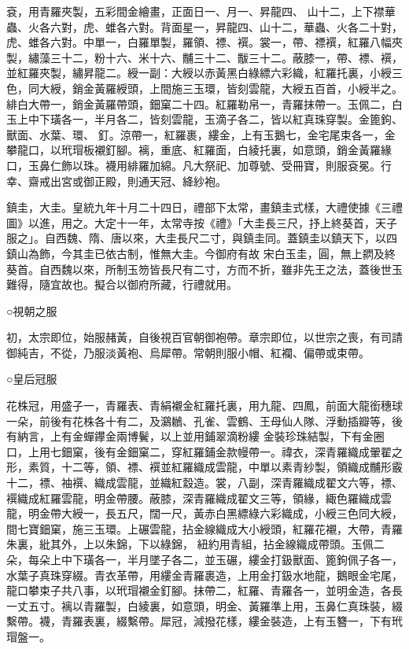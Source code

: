 \begin{pinyinscope}
 袞，用青羅夾製，五彩間金繪畫，正面日一、月一、昇龍四、
 山十二，上下襟華蟲、火各六對，虎、蜼各六對。背面星一，昇龍四、山十二，華蟲、火各二十對，虎、蜼各六對。中單一，白羅單製，羅領、褾、襈。裳一，帶、褾襈，紅羅八幅夾製，繡藻三十二，粉十六、米十六、黼三十二、黻三十二。蔽膝一，帶、褾、襈，並紅羅夾製，繡昇龍二。綬一副：大綬以赤黃黑白綠縹六彩織，紅羅托裏，小綬三色，同大綬，銷金黃羅綬頭，上間施三玉環，皆刻雲龍，大綬五百首，小綬半之。緋白大帶一，銷金黃羅帶頭，鈿窠二十四。紅羅勒帛一，青羅抹帶一。玉佩二，白玉上中下璜各一，半月各二，皆刻雲龍，玉滴子各二，皆以紅真珠穿製。金篦鉤、獸面、水葉、環、
 釘。涼帶一，紅羅裹，縷金，上有玉鵝七，金宅尾束各一，金攀龍口，以玳瑁板襯釘腳。褵，重底、紅羅面，白綾托裏，如意頭，銷金黃羅緣口，玉鼻仁飾以珠。襪用緋羅加綿。凡大祭祀、加尊號、受冊寶，則服袞冕。行幸、齋戒出宮或御正殿，則通天冠、絳紗袍。



 鎮圭，大圭。皇統九年十月二十四日，禮部下太常，畫鎮圭式樣，大禮使據《三禮圖》以進，用之。大定十一年，太常寺按《禮》「大圭長三尺，抒上終葵首，天子服之」。自西魏、隋、唐以來，大圭長尺二寸，與鎮圭同。蓋鎮圭以鎮天下，以四鎮山為飾，今其圭已依古制，惟無大圭。今御府有故
 宋白玉圭，圓，無上閷及終葵首。自西魏以來，所制玉笏皆長尺有二寸，方而不折，雖非先王之法，蓋後世玉難得，隨宜故也。擬合以御府所藏，行禮就用。



 ○視朝之服



 初，太宗即位，始服赭黃，自後視百官朝御袍帶。章宗即位，以世宗之喪，有司請御純吉，不從，乃服淡黃袍、烏犀帶。常朝則服小帽、紅襴、偏帶或束帶。



 ○皇后冠服



 花株冠，用盛子一，青羅表、青絹襯金紅羅托裏，用九龍、四鳳，前面大龍銜穗球一朵，前後有花株各十有二，及鸂鶒、孔雀、雲鶴、王母仙人隊、浮動插瓣等，後有納言，上有金蟬鑻金兩博鬢，以上並用鋪翠滴粉縷
 金裝珍珠結製，下有金圈口，上用七鈿窠，後有金鈿窠二，穿紅羅鋪金款幔帶一。禕衣，深青羅織成翬翟之形，素質，十二等，領、褾、襈並紅羅織成雲龍，中單以素青紗製，領織成黼形霰十二，褾、袖襈、織成雲龍，並織紅縠造。裳，八副，深青羅織成翟文六等，褾、襈織成紅羅雲龍，明金帶腰。蔽膝，深青羅織成翟文三等，領緣，緅色羅織成雲龍，明金帶大綬一，長五尺，闊一尺，黃赤白黑縹綠六彩織成，小綬三色同大綬，間七寶鈿窠，施三玉環。上碾雲龍，拈金線織成大小綬頭，紅羅花襯，大帶，青羅朱裏，紕其外，上以朱錦，下以綠錦，
 紐約用青組，拈金線織成帶頭。玉佩二朵，每朵上中下璜各一，半月墜子各二，並玉碾，縷金打鈒獸面、篦鉤佩子各一，水葉子真珠穿綴。青衣革帶，用縷金青羅裹造，上用金打鈒水地龍，鵝眼金宅尾，龍口攀束子共八事，以玳瑁襯金釘腳。抹帶二，紅羅、青羅各一，並明金造，各長一丈五寸。褵以青羅製，白綾裏，如意頭，明金、黃羅準上用，玉鼻仁真珠裝，綴繫帶。襪，青羅表裏，綴繫帶。犀冠，減撥花樣，縷金裝造，上有玉簪一，下有玳瑁盤一。




\end{pinyinscope}
